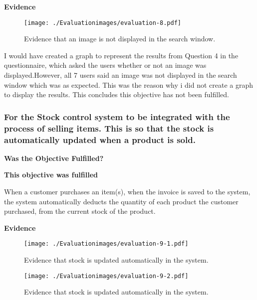 \textbf{Evidence} \newline

\begin{figure}[H]
\caption{Evidence that an image is not displayed in the search window.} \label{fig:evaluation-8}
\hfill\texttt{[image: ./Evaluationimages/evaluation-8.pdf]}
\end{figure}

I would have created a graph to represent the results from Question 4 in the questionnaire, which asked the users whether or not an image was displayed.However, all 7 users said an image was not displayed in the search window which was as expected. This was the reason why i did not create a graph to display the results.  This concludes this objective has not been fulfilled.



\pagebreak
\subsubsection{For the Stock control system to be integrated with the process of selling items. This is so that the stock is automatically updated when a product is sold.}
\label{For the Stock control system to be integrated with the process of selling items. This is so that the stock is automatically updated when a product is sold.}
\textbf{Was the Objective Fulfilled?} \newline

\textbf{\large{This objective was fulfilled}}

When a customer purchases an item(s), when the invoice is saved to the system, the system automatically deducts the quantity of each product the customer purchased, from the current stock of the product.\newline

\textbf{Evidence} \newline
\label{automatic-stock-evidence}

\begin{figure}[H]
\caption{Evidence that stock is updated automatically in the system.} \label{fig:evaluation-9-1}
\hfill\texttt{[image: ./Evaluationimages/evaluation-9-1.pdf]}
\end{figure}

\begin{figure}[H]
\caption{Evidence that stock is updated automatically in the system.} \label{fig:evaluation-9-2}
\hfill\texttt{[image: ./Evaluationimages/evaluation-9-2.pdf]}
\end{figure}

